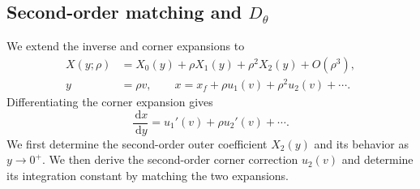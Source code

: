 \documentclass[11pt]{article}
\newcommand{\rhoeps}{\rho}
\newcommand{\xf}{x_f}
\newcommand{\Dth}{D_\theta}
\newcommand{\dd}{\,\mathrm d}
\begin{document}
\subsection{Second-order matching and \texorpdfstring{\(\Dth\)}{D theta}}
We extend the inverse and corner expansions to
\begin{align}
X(y;\rhoeps)&=X_0(y)+\rhoeps X_1(y)+\rhoeps^2X_2(y)+O(\rhoeps^3),
\label{eq:inverseexp-second-order}\\
y&=\rhoeps v,\qquad x=\xf+\rhoeps u_1(v)+\rhoeps^2u_2(v)+\cdots.
\label{eq:corner-second-order}
\end{align}
Differentiating the corner expansion gives
\begin{equation}
\frac{\dd x}{\dd y}=u_1'(v)+\rhoeps u_2'(v)+\cdots.
\label{eq:corner-derivative-second-order}
\end{equation}
We first determine the second-order outer coefficient \(X_2(y)\) and its behavior as \(y\to0^+\). We then derive the second-order corner correction \(u_2(v)\) and determine its integration constant by matching the two expansions.
\end{document}
